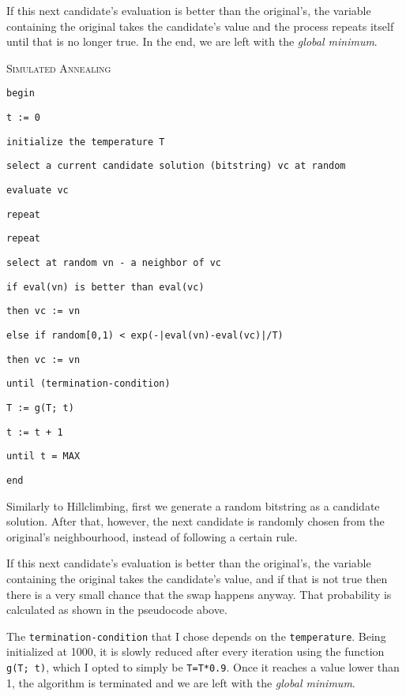 \documentclass{article}
\begin{document}
If this next candidate's evaluation is better than the original's, the variable containing the original takes the candidate's value and the process repeats itself until that is no longer true.
In the end, we are left with the \textsl{global minimum}.

\newpage

\textsc{Simulated Annealing}

\texttt{begin}

\texttt{t := 0}

\texttt{initialize the temperature T}

\texttt{select a current candidate solution (bitstring) vc at random}

\texttt{evaluate vc}

\texttt{repeat}

\quad \quad \texttt{repeat}

\quad \quad \quad \quad \texttt{select at random vn - a neighbor of vc}

\quad \quad \quad \quad \texttt{if eval(vn) is better than eval(vc)}
        
\quad \quad \quad \quad \quad \quad \texttt{then vc := vn}
        
\quad \quad \quad \quad \texttt{else if random[0,1) < exp(-|eval(vn)-eval(vc)|/T)}

\quad \quad \quad \quad \quad \quad \texttt{then vc := vn}

\quad \quad \texttt{until (termination-condition)}
    
\quad \quad \texttt{T := g(T; t)} 
    
\quad \quad \texttt{t := t + 1}
  
\texttt{until t = MAX}

\texttt{end}

\vspace{5mm}

Similarly to Hillclimbing, first we generate a random bitstring as a candidate solution. After that, however, the next candidate is randomly chosen from the original's neighbourhood, instead of following a certain rule.

If this next candidate's evaluation is better than the original's, the variable containing the original takes the candidate's value, and if that is not true then there is a very small chance that the swap happens anyway.
That probability is calculated as shown in the pseudocode above.

The \texttt{termination-condition} that I chose depends on the \texttt{temperature}. Being initialized at 1000, it is slowly reduced after every iteration using the function \texttt{g(T; t)}, which I opted to simply be \texttt{T=T*0.9}.
Once it reaches a value lower than 1, the algorithm is terminated and we are left with the \textsl{global minimum}.
\end{document}
